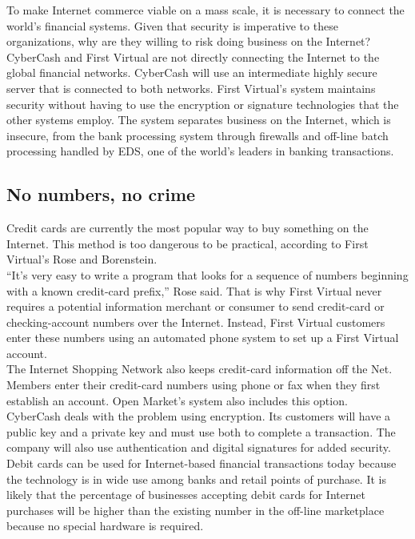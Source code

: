 To make Internet commerce viable on a mass scale, it is necessary to
connect the world's financial systems. Given that security is
imperative to these organizations, why are they willing to risk doing
business on the Internet?\\

CyberCash and First Virtual are not directly connecting the Internet to
the global financial networks. CyberCash will use an intermediate
highly secure server that is connected to both networks. First
Virtual's system maintains security without having to use the
encryption or signature technologies that the other systems employ. The
system separates business on the Internet, which is insecure, from the
bank processing system through firewalls and off-line batch processing
handled by EDS, one of the world's leaders in banking transactions.


\subsection{No numbers, no crime}
Credit cards are currently the most popular way to buy something on the
Internet. This method is too dangerous to be practical, according to
First Virtual's Rose and Borenstein.\\

``It's very easy to write a program that looks for a sequence of
numbers beginning with a known credit-card prefix,'' Rose said. That is
why First Virtual never requires a potential information merchant or
consumer to send credit-card or checking-account numbers over the
Internet. Instead, First Virtual customers enter these numbers using an
automated phone system to set up a First Virtual account.\\

The Internet Shopping Network also keeps credit-card information off
the Net. Members enter their credit-card numbers using phone or fax
when they first establish an account. Open Market's system also
includes this option.\\

CyberCash deals with the problem using encryption. Its customers will
have a public key and a private key and must use both to complete a
transaction. The company will also use authentication and digital
signatures for added security.\\

Debit cards can be used for Internet-based financial transactions today
because the technology is in wide use among banks and retail points of
purchase. It is likely that the percentage of businesses accepting
debit cards for Internet purchases will be higher than the existing
number in the off-line marketplace because no special hardware is
required.\\

